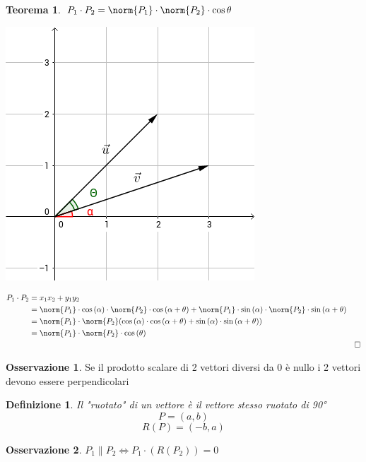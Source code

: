 \documentclass[10pt,a4paper]{article}
\theoremstyle{plain}
\newtheorem{definizione}{Definizione}
\theoremstyle{definition}
\newtheorem{teorema}{Teorema}
\newtheorem{osservazione}{Osservazione}
\begin{document}
	\begin{teorema} $P_1 \cdot P_2 = \norm{P_1} \cdot \norm{P_2} \cdot \cos{\theta}$
	
	\includegraphics[scale=0.5]{graph.png}
	
	\begin{align*}
		P_1\cdot P_2 &= x_1 x_2 + y_1 y_2 \\
		&=\norm{P_1}\cdot \cos{(\alpha)} \cdot \norm{P_2} \cdot \cos{(\alpha + \theta)} + \norm{P_1}\cdot \sin{(\alpha)} \cdot  \norm{P_2} \cdot \sin{(\alpha + \theta)} \\
		&=\norm{P_1}\cdot \norm{P_2}(\cos{(\alpha)} \cdot \cos{(\alpha + \theta)} + \sin{(\alpha)} \cdot \sin{(\alpha + \theta)}) \\
		& = \norm{P_1} \cdot \norm{P_2} \cdot \cos{(\theta)} \\
		&&\Box
	\end{align*}	
	\end{teorema}
	
	\begin{osservazione} 
		Se il prodotto scalare di 2 vettori diversi da 0 è nullo i 2 vettori devono essere perpendicolari
	\end{osservazione}
	
	\begin{definizione} Il "ruotato" di un vettore è il vettore stesso ruotato di 90°
		\[P=(a,b)\]
		\[R(P)=(-b,a)\]
	\end{definizione}
	\begin{osservazione}
		$P_1 \parallel P_2 \Leftrightarrow P_1 \cdot (R(P_2))=0$
	\end{osservazione}
\end{document}
